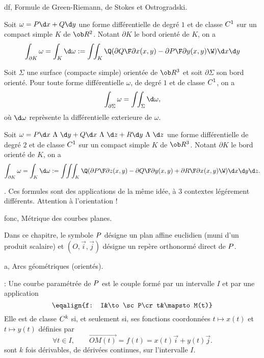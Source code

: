 \Section df, Formule de Green-Riemann, de Stokes et Ostrogradski.

\Theoreme [Title=Formule de Green-Riemann] Soit $\omega=P\d x+Q\d y$ une forme différentielle 
de degré $1$ et de classe $\sc C^1$ sur un compact simple $K$ de $\ob R^2$. 
Notant $\partial K$ le bord orienté de $K$, on a  
$$
\int_{\partial K}\omega=\int_K\d \omega:=\int\!\!\int_K\Q({\partial Q\F\partial x}(x,y)-{\partial P\F\partial y}(x,y)\W)\d x\d y
$$

\Theoreme [Title=Formule de Stokes] Soit $\Sigma$ une surface (compacte simple) 
orientée de $\ob R^3$ et soit $\partial\Sigma$ son bord orienté. 
Pour toute forme différentielle $\omega$, de degré $1$ et de classe $\sc C^1$, 
on a 
$$
\int_{\partial\Sigma}\omega=\int\!\!\int_\Sigma\d\omega, 
$$
où $\d\omega$ reprèsente la différentielle exterieure de $\omega$. 
\bigskip

\Theoreme [Title=Formule d'Ostrogradski] Soit $\omega=P\d x\ \Lambda\ \d y
+Q\d x\ \Lambda\ \d z+R\d y\ \Lambda\ \d z$ une forme différentielle 
de degré $2$ et de classe $\sc C^1$ sur un compact simple $K$ de $\ob R^3$. 
Notant $\partial K$ le bord orienté de $K$, on a  
$$
\int_{\partial K}\omega=\int_K\d \omega:=
\int\!\!\int\!\!\int_K\Q({\partial P\F\partial z}(x,y)-{\partial Q\F\partial y}(x,y)
+{\partial R\F\partial x}(x,y)\W)\d x\d y\d z.
$$

\Remarque. Ces formules sont des applications de la même idée, 
à $3$ contextes légérement différents. Attention à l'orientation ! 





\pagetitretrue

\Chapter fonc, Métrique des courbes planes.
\bigskip


\noindent
Dans ce chapitre, le symbole $\sc P$ désigne un plan affine euclidien (muni d'un produit scalaire) 
et $(O,\vec i,\vec j)$ désigne un repère orthonormé direct de $\sc P$. 
\bigskip

\Section a, Arcs géométriques (orientés).

\Rappel : Une courbe paramétrée de $\sc P$ est le couple formé par un intervalle $I$ et par une application 
$$
\eqalign{f: I&\to\sc P\cr t&\mapsto  M(t)}
$$ 
Elle est de classe $\sc C^k$ si, et seulement si, ses fonctions coordonnées $t\mapsto x(t)$ et $t\mapsto y(t)$ définies par 
$$
\forall t\in I, \qquad \vec {OM(t)}=f(t)=x(t)\vec i+y(t)\vec j. 
$$
sont $k$ fois dérivables, de dérivées continues, sur l'intervalle $I$. 
\bigskip

